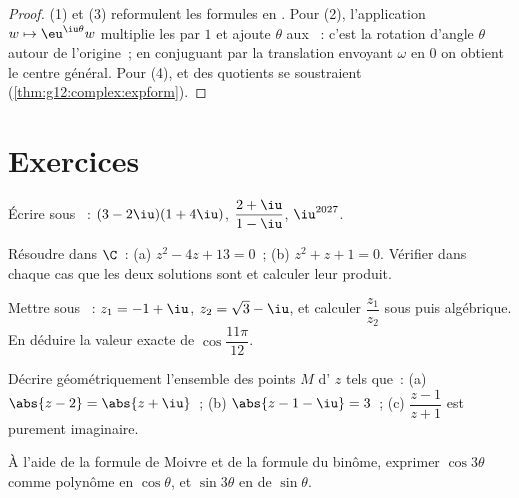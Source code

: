 \begin{proof}
(1) et (3) reformulent les formules en . Pour (2), l'application
$w \mapsto \eu^{\iu\theta} w$ multiplie les  par $1$ et ajoute
$\theta$ aux ~: c'est la rotation d'angle $\theta$ autour de
l'origine~; en conjuguant par la translation envoyant $\omega$ en $0$ on
obtient le centre général. Pour (4),  et  des quotients se
soustraient (\cref{thm:g12:complex:expform}).
\end{proof}

\section{Exercices}

\begin{exercise}[$\star$]\label{exo:g12:complex:1}
Écrire sous ~:
$(3 - 2\iu)(1 + 4\iu)$, \quad $\dfrac{2 + \iu}{1 - \iu}$, \quad
$\iu^{2027}$.
\end{exercise}

\begin{exercise}[$\star$]\label{exo:g12:complex:2}
Résoudre dans $\C$~: (a) $z^2 - 4z + 13 = 0$~; (b) $z^2 + z + 1 = 0$.
Vérifier dans chaque cas que les deux solutions sont  et calculer
leur produit.
\end{exercise}

\begin{exercise}[$\star$]\label{exo:g12:complex:3}
Mettre sous ~: $z_1 = -1 + \iu$, $z_2 = \sqrt3 - \iu$,
et calculer $\dfrac{z_1}{z_2}$ sous  puis algébrique. En
déduire la valeur exacte de $\cos\dfrac{11\pi}{12}$.
\end{exercise}

\begin{exercise}[$\star\star$]\label{exo:g12:complex:4}
Décrire géométriquement l'ensemble des points $M$ d' $z$ tels que~:
(a) $\abs{z - 2} = \abs{z + \iu}$~;\quad
(b) $\abs{z - 1 - \iu} = 3$~;\quad
(c) $\dfrac{z - 1}{z + 1}$ est purement imaginaire.
\end{exercise}

\begin{exercise}[$\star\star$]\label{exo:g12:complex:5}
À l'aide de la formule de Moivre et de la formule du binôme, exprimer
$\cos 3\theta$ comme polynôme en $\cos\theta$, et $\sin 3\theta$ en
 de $\sin\theta$.
\end{exercise}

